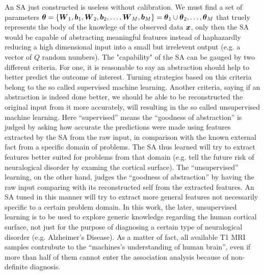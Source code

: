 An SA just constructed is useless without calibration. We must find a set of parameters $\boldsymbol{\theta}=\{\boldsymbol{W}_1, \boldsymbol{b}_1, \boldsymbol{W}_2, \boldsymbol{b}_2, \dots, \boldsymbol{W}_M, \boldsymbol{b}_M\} = \boldsymbol{\theta}_1 \cup \boldsymbol{\theta}_2, \dots, \boldsymbol{\theta}_M$ that truely represents the body of the knowlege of the observed data $\boldsymbol{x}$, only then the SA would be capable of abstracting meaningful features instead of haphazardly reducing a high dimensional input into a small but irrelevent output (e.g. a vector of $Q$ random numbers). The "capability" of the SA can be gauged by two different criteria. For one, it is reasonable to say an abstraction should help to better predict the outcome of interest. Turning strategies based on this criteria belong to the so called supervised machine learning. Another criteria, saying if an abstraction is indeed done better, we should be able to be reconstructed the original input from it more accurately, will resulting in the so called unsupervised machine learning. Here ``supervised'' means the ``goodness of abstraction'' is judged by asking how accurate the predictions were made using features extracted by the SA from the raw input, in comparison with the known external fact from a specific domain of problems. The SA thus learned will try to extract features better suited for problems from that domain (e.g. tell the future risk of neuralogical disorder by examing the cortical surface). The ``unsupervised'' learning, on the other hand, judges the ``goodness of abstraction'' by having the raw input comparing with its reconstructed self from the extracted features. An SA tuned in this manner will try to extract more general features not necessarily specific to a certain problem domain. In this work, the later, unsupervised learning is to be used to explore generic knowledge regarding the human cortical surface, not just for the purpose of diagnosing a certain type of neuralogical disorder (e.g. Alzheimer's Disease). As a matter of fact, all available T1 MRI samples contrubute to the ``machines's understanding of human brain'', even if more than half of them cannot enter the association analysis because of non-definite diagnosis.

